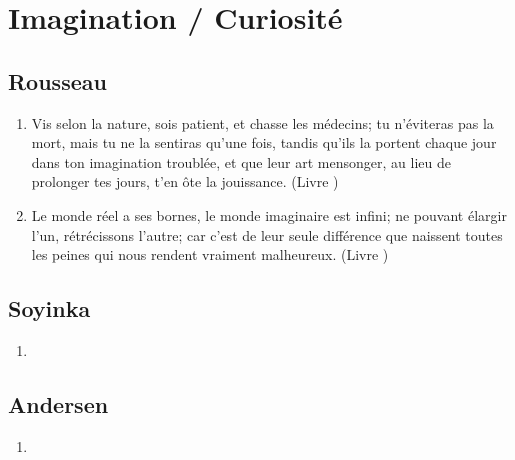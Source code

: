 \documentclass[a4paper, 11pt, hidelinks]{article}
\newcommand{\rb}[1]{\Romanbar{#1}}
\begin{document}
\section{Imagination / Curiosité}



\subsection{Rousseau}


\begin{enumerate}
    \item Vis selon la nature, sois patient, et chasse les médecins; tu n'éviteras pas la mort, mais tu ne la sentiras qu'une fois, tandis qu'ils la portent chaque jour dans ton imagination troublée, et que leur art mensonger, au lieu de prolonger tes jours, t'en ôte la jouissance. (Livre \rb{2})
    \item Le monde réel a ses bornes, le monde imaginaire est infini; ne pouvant élargir l'un, rétrécissons l'autre; car c'est de leur seule différence que naissent toutes les peines qui nous rendent vraiment malheureux. (Livre \rb{2})
\end{enumerate}



\subsection{Soyinka}


\begin{enumerate}
    \item 
\end{enumerate}




\subsection{Andersen}


\begin{enumerate}
    \item 
\end{enumerate}
\end{document}
